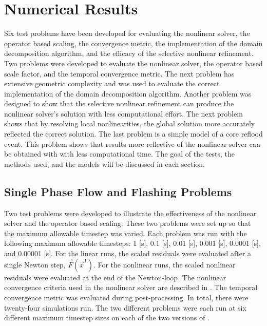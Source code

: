 \chapter{Numerical Results}
\label{chap:results}

Six test problems have been developed for evaluating the nonlinear solver, the operator based scaling, the convergence metric, the implementation of the domain decomposition algorithm, and the efficacy of the selective nonlinear refinement.
Two problems were developed to evaluate the nonlinear solver, the operator based scale factor, and the temporal convergence metric.
The next problem has extensive geometric complexity and was used to evaluate the correct implementation of the domain decomposition algorithm.
Another problem was designed to show that the selective nonlinear refinement can produce the nonlinear solver's solution with less computational effort.
The next problem shows that by resolving local nonlinearities, the global solution more accurately reflected the correct solution.
The last problem is a simple model of a core reflood event.
This problem shows that results more reflective of the nonlinear solver can be obtained with with less computational time.
The goal of the tests, the methods used, and the models will be discussed in each section.

\section{Single Phase Flow and Flashing Problems}
\label{sect:single_phase_and_flashing}

Two test problems were developed to illustrate the effectiveness of the nonlinear solver and the operator based scaling.
These two problems were set up so that the maximum allowable timestep was varied.
Each problem was run with the following maximum allowable timesteps: 1 [s], 0.1 [s], 0.01 [s], 0.001 [s], 0.0001 [s], and 0.00001 [s]. 
For the linear runs, the scaled residuals were evaluated after a single Newton step, $\vec{F}(\vec{x}^{1})$.
For the nonlinear runs, the scaled nonlinear residuals were evaluated at the end of the Newton-loop.
The nonlinear convergence criteria used in the nonlinear solver are described in .
The temporal convergence metric was evaluated during post-processing.
In total, there were twenty-four simulations run.
The two different problems were each run at six different maximum timestep sizes on each of the two versions of \cobra{}.

